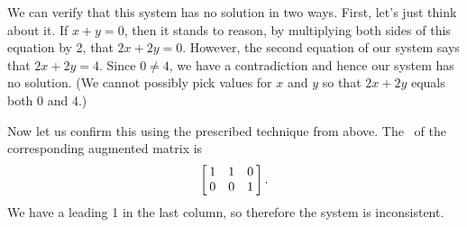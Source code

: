 {We can verify that this system has no solution in two ways. First, let's just think about it. If $x+y=0$, then it stands to reason, by multiplying both sides of this equation by 2, that $2x+2y = 0$. However, the second equation of our system says that $2x+2y= 4$. Since $0\neq 4$, we have a contradiction and hence our system has no solution. (We cannot possibly pick values for $x$ and $y$ so that $2x+2y$ equals both 0 and 4.)

Now let us confirm this using the prescribed technique from above. The \rref\  of the corresponding augmented matrix is $$\bmx{ccc} 1&1&0\\0&0&1\\ \emx.$$ We have a leading 1 in the last column, so therefore the system is inconsistent. }\\


%

%
%

